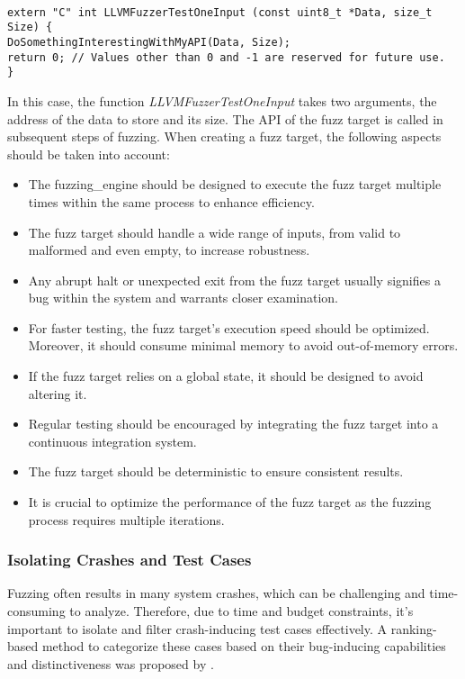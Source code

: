 \begin{verbatim}

extern "C" int LLVMFuzzerTestOneInput (const uint8_t *Data, size_t Size) {
DoSomethingInterestingWithMyAPI(Data, Size);
return 0; // Values other than 0 and -1 are reserved for future use.
}

\end{verbatim}

In this case, the function \textit{LLVMFuzzerTestOneInput} takes two arguments,
the address of the data to store and its size. The API of the fuzz target is
called in subsequent steps of fuzzing. When creating a fuzz target, the
following aspects should be taken into account\cite{libFuzze17:online}\cite{257204}:

\begin{itemize}
\item The \gls{fuzzing_engine} should be designed to execute the fuzz target
multiple times within the same process to enhance efficiency.
\item The fuzz target should handle a wide range of inputs, from valid to
malformed and even empty, to increase robustness.
\item Any abrupt halt or unexpected exit from the fuzz target usually
signifies a bug within the system and warrants closer examination.
\item For faster testing, the fuzz target's execution speed should be
optimized. Moreover, it should consume minimal memory to avoid out-of-memory errors.
\item If the fuzz target relies on a global state, it should be
designed to avoid altering it.
\item Regular testing should be encouraged by integrating the fuzz
target into a continuous integration system.
\item The fuzz target should be deterministic to ensure consistent results.
\item It is crucial to optimize the performance of the fuzz target as the
fuzzing process requires multiple iterations.
\end{itemize}

\subsubsection{Isolating Crashes and Test Cases}

Fuzzing often results in many system crashes, which can be challenging and
time-consuming to analyze. Therefore, due to time and budget constraints, it's
important to isolate and filter crash-inducing test cases effectively. A
ranking-based method to categorize these cases based on their bug-inducing
capabilities and distinctiveness was proposed by \cite{chen2013taming}.


